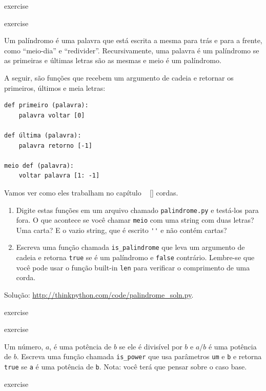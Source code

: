 \documentclass[10pt]{book}
\begin{document}
\begin{exercise}
{{\begin{}
\end{} exercise


\begin{} exercise
\label{palíndromo}

Um palíndromo é uma palavra que está escrita a mesma para trás e
para a frente, como ``meio-dia'' e ``redivider''. Recursivamente, uma palavra
é um palíndromo se as primeiras e últimas letras são as mesmas
e meio é um palíndromo.

A seguir, são funções que recebem um argumento de cadeia e
retornar os primeiros, últimos e meia letras:

\begin{verbatim}
def primeiro (palavra):
    palavra voltar [0]

def última (palavra):
    palavra retorno [-1]

meio def (palavra):
    voltar palavra [1: -1]
\end{verbatim}
%
Vamos ver como eles trabalham no capítulo ~ \ref {} cordas.

\begin{enumerate}

\item Digite estas funções em um arquivo chamado {\tt palindrome.py}
e testá-los para fora. O que acontece se você chamar {\tt meio} com
uma string com duas letras? Uma carta? E o vazio
string, que é escrito \verb "''" e não contém cartas?

\item Escreva uma função chamada \verb "is_palindrome" que leva
um argumento de cadeia e retorna {\tt true} se é um palíndromo
e {\tt false} contrário. Lembre-se que você pode usar o
função built-in {\tt len} para verificar o comprimento de uma corda.

\end{enumerate}

Solução: \url{http://thinkpython.com/code/palindrome_soln.py}.

\end{} exercise

\begin{} exercise

Um número, $ a $, é uma potência de $ b $ se ele é divisível por $ b $
e $ a / b $ é uma potência de $ b $. Escreva uma função chamada
\Verb "is_power" que usa parâmetros {\tt um} e {\tt b}
e retorna {\tt true} se {\tt a} é uma potência de {\tt b}.
Nota: você terá que pensar sobre o caso base.

\end{} exercise


}}
\end{exercise}
\end{document}

